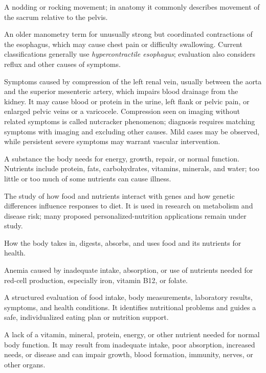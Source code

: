  A nodding or rocking movement; in anatomy it commonly describes movement of the sacrum relative to the pelvis.

 An older manometry term for unusually strong but coordinated contractions of the esophagus, which may cause chest pain or difficulty swallowing. Current classifications generally use \textit{hypercontractile esophagus}; evaluation also considers reflux and other causes of symptoms.

 Symptoms caused by compression of the left renal vein,
usually between the aorta and the superior mesenteric artery, which impairs blood
drainage from the kidney. It may cause blood or protein in the urine, left flank or
pelvic pain, or enlarged pelvic veins or a varicocele. Compression seen on imaging
without related symptoms is called nutcracker phenomenon; diagnosis requires matching
symptoms with imaging and excluding other causes. Mild cases may be observed, while
persistent severe symptoms may warrant vascular intervention.

 A substance the body needs for energy, growth, repair, or normal function. Nutrients include protein, fats, carbohydrates, vitamins, minerals, and water; too little or too much of some nutrients can cause illness.

 The study of how food and nutrients interact with genes and how genetic differences influence responses to diet. It is used in research on metabolism and disease risk; many proposed personalized-nutrition applications remain under study.

 How the body takes in, digests, absorbs, and uses food and its nutrients for health.

 Anemia caused by inadequate intake, absorption, or use of nutrients needed for red-cell production, especially iron, vitamin B12, or folate.

 A structured evaluation of food intake, body measurements, laboratory results, symptoms, and health conditions. It identifies nutritional problems and guides a safe, individualized eating plan or nutrition support.

 A lack of a vitamin, mineral, protein, energy, or other nutrient needed for normal body function. It may result from inadequate intake, poor absorption, increased needs, or disease and can impair growth, blood formation, immunity, nerves, or other organs.


